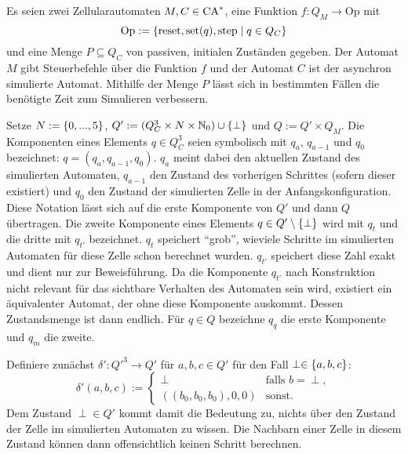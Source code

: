 \begin{definition}
    \label{erweiterteNakamuraKonstruktion}
    Es seien zwei Zellularautomaten $M, C \in \textrm{CA}^*$, eine Funktion $f: Q_M \to \mathrm{Op}$
    mit 
    \[
        \mathrm{Op} := \{ { \mathrm{reset}, \mathrm{set}(q), \mathrm{step} } \; | \; { q \in Q_C } \}
    \]        
    und eine Menge $P \subseteq Q_C$ von passiven, initialen Zuständen gegeben.
    Der Automat $M$ gibt Steuerbefehle über die Funktion $f$ und der Automat $C$ ist der asynchron simulierte Automat.
    Mithilfe der Menge $P$ lässt sich in bestimmten Fällen
    die benötigte Zeit zum Simulieren verbessern.
    
    Setze $N := \{ { 0, ..., 5 } \}$, $Q' := (Q_C^3 \times N \times \mathbb{N}_0) \cup \{ { \perp } \}$ und $Q := Q' \times Q_M$.
    Die Komponenten eines Elements $q \in Q_C^3$ seien symbolisch mit $q_a$, $q_{a-1}$ und $q_0$ bezeichnet: $q = (q_a, q_{a-1}, q_0)$.
    $q_a$ meint dabei den aktuellen Zustand des simulierten Automaten, $q_{a-1}$ den Zustand des vorherigen Schrittes (sofern dieser existiert) und $q_0$ den Zustand der simulierten Zelle in der Anfangskonfiguration.
    Diese Notation lässt sich auf die erste Komponente von $Q'$ und dann $Q$ übertragen. Die zweite Komponente eines Elements $q \in Q' \setminus \{ { \perp } \}$ wird mit $q_t$ und die dritte mit $q_{t'}$ bezeichnet. $q_t$ speichert \enquote{grob}, wieviele Schritte im simulierten Automaten für diese Zelle schon berechnet wurden. $q_{t'}$ speichert diese Zahl exakt und dient nur zur Beweisführung. Da die Komponente $q_{t'}$
    nach Konstruktion nicht relevant für das sichtbare Verhalten des Automaten sein wird, existiert ein äquivalenter Automat, der ohne diese Komponente auskommt. Dessen Zustandsmenge ist dann endlich.
    Für $q \in Q$ bezeichne $q_q$ die erste Komponente und $q_m$ die zweite.
    
    Definiere zunächst $\delta': {Q'}^3 \to Q'$ für $a, b, c \in Q'$ für den Fall $\perp \in \{ { a, b, c } \}$:
    \[
        \delta'(a, b, c) := 
        \begin{cases}
            \perp & \text{falls } b = \perp, \\
            ((b_0, b_0, b_0), 0, 0) & \text{sonst.}
        \end{cases}
    \]
    Dem Zustand $\perp \in Q'$ kommt damit die Bedeutung zu, nichts über den Zustand der Zelle im simulierten Automaten zu wissen.
    Die Nachbarn einer Zelle in diesem Zustand können dann offensichtlich keinen Schritt berechnen.
    

\end{definition}
